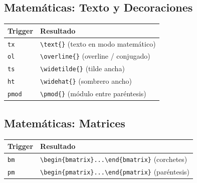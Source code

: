 \documentclass[11pt]{article}
\begin{document}
\subsection{Matemáticas: Texto y Decoraciones}
\label{sec:org3badf8f}
\begin{center}
\begin{tabular}{ll}
Trigger & Resultado\\
\hline
\texttt{tx} & \texttt{\textbackslash{}text\{\}} (texto en modo matemático)\\
\texttt{ol} & \texttt{\textbackslash{}overline\{\}} (overline / conjugado)\\
\texttt{ts} & \texttt{\textbackslash{}widetilde\{\}} (tilde ancha)\\
\texttt{ht} & \texttt{\textbackslash{}widehat\{\}} (sombrero ancho)\\
\texttt{pmod} & \texttt{\textbackslash{}pmod\{\}} (módulo entre paréntesis)\\
\end{tabular}
\end{center}
\subsection{Matemáticas: Matrices}
\label{sec:orge53f666}
\begin{center}
\begin{tabular}{ll}
Trigger & Resultado\\
\hline
\texttt{bm} & \texttt{\textbackslash{}begin\{bmatrix\}...\textbackslash{}end\{bmatrix\}} (corchetes)\\
\texttt{pm} & \texttt{\textbackslash{}begin\{pmatrix\}...\textbackslash{}end\{pmatrix\}} (paréntesis)\\
\end{tabular}
\end{center}
\end{document}
